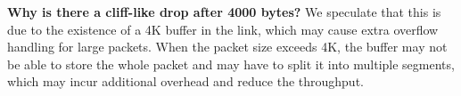 \textbf{Why is there a cliff-like drop after 4000 bytes?} We speculate that this is due to the existence of a 4K buffer in the link, which may cause extra overflow handling for large packets. When the packet size exceeds 4K, the buffer may not be able to store the whole packet and may have to split it into multiple segments, which may incur additional overhead and reduce the throughput.



